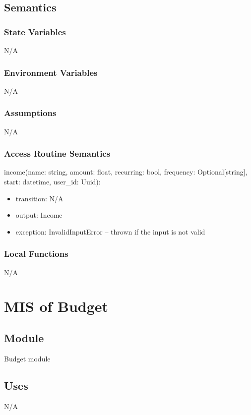 \documentclass[12pt, titlepage]{article}
\begin{document}
\subsection{Semantics}

\subsubsection{State Variables}
N/A

\subsubsection{Environment Variables}
N/A

\subsubsection{Assumptions}
N/A

\subsubsection{Access Routine Semantics}

\noindent income(name: string, amount: float, recurring: bool, frequency:
Optional[string], start: datetime, user\_id: Uuid):
\begin{itemize}
\item transition: N/A
\item output: Income
\item exception: InvalidInputError -- thrown if the input is not valid
\end{itemize}

\subsubsection{Local Functions}
N/A

\newpage

\section{MIS of Budget}\label{budget_module}

\subsection{Module}

Budget module

\subsection{Uses}
N/A
\end{document}
